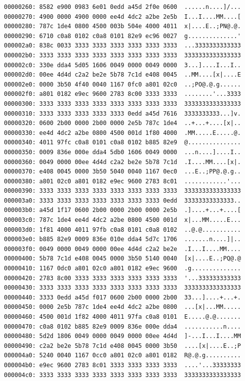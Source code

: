\documentclass[paper=a4, fontsize=11pt]{scrartcl}
\numberwithin{equation}{section}		%
\numberwithin{figure}{section}			%
\numberwithin{table}{section}				%
\begin{document}
\begin{lstlisting}
00000260: 8582 e900 0983 6e01 0edd a45d 2f0e 0600  ......n....]/...
00000270: 4900 0000 4900 0000 ee4d 4dc2 a2be 2e5b  I...I....MM....[
00000280: 787c 1de4 0800 4500 003b 504e 4000 4011  x|....E..;PN@.@.
00000290: 6710 c0a8 0102 c0a8 0101 82e9 ec96 0027  g..............'
000002a0: 838c 0033 3333 3333 3333 3333 3333 3333  ...3333333333333
000002b0: 3333 3333 3333 3333 3333 3333 3333 3333  3333333333333333
000002c0: 330e dda4 5d05 1606 0049 0000 0049 0000  3...]....I...I..
000002d0: 00ee 4d4d c2a2 be2e 5b78 7c1d e408 0045  ..MM....[x|....E
000002e0: 0000 3b50 4f40 0040 1167 0fc0 a801 02c0  ..;PO@.@.g......
000002f0: a801 0182 e9ec 9600 2783 8c00 3333 3333  ........'...3333
00000300: 3333 3333 3333 3333 3333 3333 3333 3333  3333333333333333
00000310: 3333 3333 3333 3333 3333 0edd a45d 7616  3333333333...]v.
00000320: 0600 2b00 0000 2b00 0000 2e5b 787c 1de4  ..+...+....[x|..
00000330: ee4d 4dc2 a2be 0800 4500 001d 1f80 4000  .MM.....E.....@.
00000340: 4011 97fc c0a8 0101 c0a8 0102 b885 82e9  @...............
00000350: 0009 836e 000e dda4 5db0 1606 0049 0000  ...n....]....I..
00000360: 0049 0000 00ee 4d4d c2a2 be2e 5b78 7c1d  .I....MM....[x|.
00000370: e408 0045 0000 3b50 5040 0040 1167 0ec0  ...E..;PP@.@.g..
00000380: a801 02c0 a801 0182 e9ec 9600 2783 8c01  ............'...
00000390: 3333 3333 3333 3333 3333 3333 3333 3333  3333333333333333
000003a0: 3333 3333 3333 3333 3333 3333 3333 0edd  33333333333333..
000003b0: a45d 1f17 0600 2b00 0000 2b00 0000 2e5b  .]....+...+....[
000003c0: 787c 1de4 ee4d 4dc2 a2be 0800 4500 001d  x|...MM.....E...
000003d0: 1f81 4000 4011 97fb c0a8 0101 c0a8 0102  ..@.@...........
000003e0: b885 82e9 0009 836e 010e dda4 5d7c 1706  .......n....]|..
000003f0: 0049 0000 0049 0000 00ee 4d4d c2a2 be2e  .I...I....MM....
00000400: 5b78 7c1d e408 0045 0000 3b50 5140 0040  [x|....E..;PQ@.@
00000410: 1167 0dc0 a801 02c0 a801 0182 e9ec 9600  .g..............
00000420: 2783 8c00 3333 3333 3333 3333 3333 3333  '...333333333333
00000430: 3333 3333 3333 3333 3333 3333 3333 3333  3333333333333333
00000440: 3333 0edd a45d f017 0600 2b00 0000 2b00  33...]....+...+.
00000450: 0000 2e5b 787c 1de4 ee4d 4dc2 a2be 0800  ...[x|...MM.....
00000460: 4500 001d 1f82 4000 4011 97fa c0a8 0101  E.....@.@.......
00000470: c0a8 0102 b885 82e9 0009 836e 000e dda4  ...........n....
00000480: 5d2d 1806 0049 0000 0049 0000 00ee 4d4d  ]-...I...I....MM
00000490: c2a2 be2e 5b78 7c1d e408 0045 0000 3b50  ....[x|....E..;P
000004a0: 5240 0040 1167 0cc0 a801 02c0 a801 0182  R@.@.g..........
000004b0: e9ec 9600 2783 8c01 3333 3333 3333 3333  ....'...33333333
000004c0: 3333 3333 3333 3333 3333 3333 3333 3333  3333333333333333

\end{lstlisting}
\end{document}
